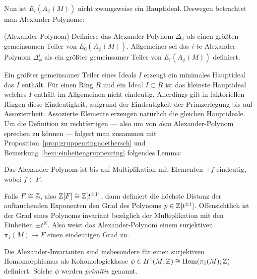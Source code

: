     	Nun ist $E_i(A_\phi(M))$ nicht zwangsweise ein Hauptideal. Deswegen betrachtet man Alexander-Polynome:
    	\begin{defn}(Alexander-Polynom)
    		Definiere das Alexander-Polynom $\Delta_\phi$ als einen größten gemeinsamen Teiler von $E_0(A_\phi(M))$. Allgemeiner sei das $i$-te Alexander-Polynom $\Delta_\phi^i$ als ein größter gemeinsamer Teiler von $E_i(A_\phi(M))$ definiert.
    	\end{defn}
    	Ein größter gemeinsamer Teiler eines Ideals $I$ erzeugt ein minimales Hauptideal das $I$ enthält. Für einen Ring $R$ und ein Ideal $I\subset R$ ist das kleinste Hauptideal welches $I$ enthält im Allgemeinen nicht eindeutig. Allerdings gilt in faktoriellen Ringen diese Eindeutigkeit, aufgrund der Eindeutigkeit der Primzerlegung bis auf Assoziertheit. Assozierte Elemente erzeugen natürlich die gleichen Hauptideale. Um die Definition zu rechtfertigen --- also um von \emph{dem} Alexander-Polynom sprechen zu können --- folgert man zusammen mit Proposition~\ref{prop:gruppenringnoethersch} und Bemerkung~\ref{bem:einheitengruppenring} folgendes Lemma:
    	\begin{lem}
    		Das Alexander-Polynom ist bis auf Multiplikation mit Elementen $\pm f$ eindeutig, wobei $f\in F$.
    	\end{lem}

    	\begin{bem}
    		Falls $F \cong \mathbb{Z}$, also $\mathbb{Z}[F]\cong \mathbb{Z}[t^{\pm 1}]$, dann definiert die höchste Distanz der auftauchenden Exponenten den Grad des Polynoms $p \in \mathbb{Z}[t^{\pm 1}]$. Offensichtlich ist der Grad eines Polynoms invariant bezüglich der Multiplikation mit den Einheiten $\pm t^N$. Also weist das Alexander-Polynom einem surjektiven $\pi_1(M)\to F$ einen eindeutigen Grad zu.
    	\end{bem}

    	 Die Alexander-Invarianten sind insbesondere für einen surjektiven Homomorphismus als Kohomologieklasse $\phi\in H^1(M;\mathbb{Z}) \cong \operatorname{Hom}(\pi_1(M);\mathbb{Z})$ definiert. Solche $\phi$ werden \emph{primitiv} genannt. 
   		
